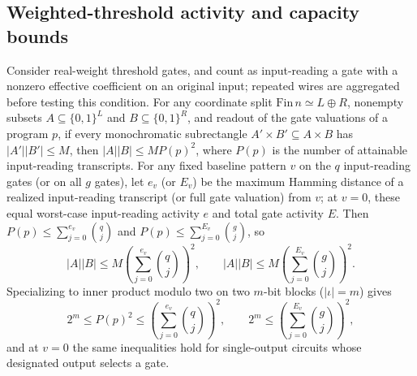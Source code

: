 \begin{result}
\subsection{Weighted-threshold activity and capacity bounds}
Consider real-weight threshold gates, and count as input-reading a gate with a
nonzero effective coefficient on an original input; repeated wires are aggregated
before testing this condition. For any coordinate split
$\mathrm{Fin}\,n\simeq L\oplus R$, nonempty subsets
$A\subseteq\{0,1\}^L$ and $B\subseteq\{0,1\}^R$, and readout of the gate
valuations of a program $p$, if every monochromatic subrectangle
$A'\times B'\subseteq A\times B$ has $|A'||B'|\le M$, then
$|A||B|\le M P(p)^2$, where $P(p)$ is the number of attainable input-reading
transcripts. For any fixed baseline pattern $v$ on the $q$ input-reading gates
(or on all $g$ gates), let $e_v$ (or $E_v$) be the maximum Hamming distance of a
realized input-reading transcript (or full gate valuation) from $v$; at $v=0$,
these equal worst-case input-reading activity $e$ and total gate activity $E$.
Then $P(p)\le\sum_{j=0}^{e_v}\binom qj$ and
$P(p)\le\sum_{j=0}^{E_v}\binom gj$, so
\[
|A||B|\le M\left(\sum_{j=0}^{e_v}\binom qj\right)^2,\qquad
|A||B|\le M\left(\sum_{j=0}^{E_v}\binom gj\right)^2.
\]
Specializing to inner product modulo two on two $m$-bit blocks ($|\iota|=m$)
gives
\[
2^m\le P(p)^2\le\left(\sum_{j=0}^{e_v}\binom qj\right)^2,\qquad
2^m\le\left(\sum_{j=0}^{E_v}\binom gj\right)^2,
\]
and at $v=0$ the same inequalities hold for single-output circuits whose
designated output selects a gate.\citep{ThresholdCircuitRepresentations2026}

\end{result}

